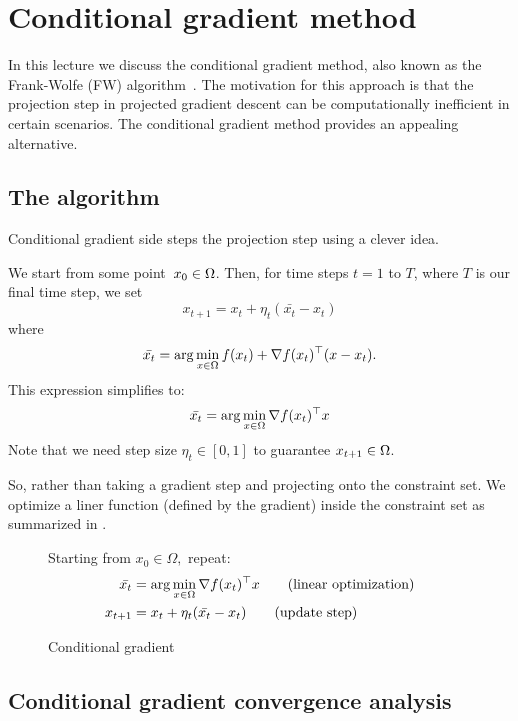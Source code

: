 \section{Conditional gradient method}

In this lecture we discuss the conditional gradient method, also known as the
Frank-Wolfe (FW) algorithm~\cite{Frank1956}. The motivation for this approach is
that the projection step in projected gradient descent can be computationally
inefficient in certain scenarios. The conditional gradient method provides an
appealing alternative.

\subsection{The algorithm}
Conditional gradient side steps the projection step using a clever idea.

We start from some point~$x_0\in\Omega$. Then, for time steps $t = 1$ to $T$, 
where $T$ is our final time step, we set
\[
x_{t+1} = x_t + \eta_t(\bar{x_t}-x_t)
\]
where
$$ \bar{x_t} = \arg\min_{x\in \Omega} f(x_t) + \nabla f(x_t) ^\top (x-x_t).$$
This expression simplifies to:
$$ \bar{x_t} = \arg\min_{x\in \Omega} \nabla f(x_t) ^\top x $$
Note that we need step size $\eta_t \in [0,1]$ to guarantee $x_{t+1} \in \Omega$.

So, rather than taking a gradient step and projecting onto the constraint set.
We optimize a liner function (defined by the gradient) inside the constraint
set as summarized in .

\begin{figure}[h]
\begin{center}
\begin{boxedminipage}{0.85\textwidth}
Starting from $x_0\in\Omega,$ repeat:
\begin{align*}
\bar{x_t} &= \arg\min_{x\in \Omega} \nabla f(x_t) ^\top x \tag{linear optimization}\\
x_{t+1} &= x_t + \eta_t(\bar{x_t}-x_t) \tag{update step}\\
\end{align*}
\end{boxedminipage}
\end{center}
\caption{Conditional gradient}
\end{figure}


\subsection{Conditional gradient convergence analysis}


